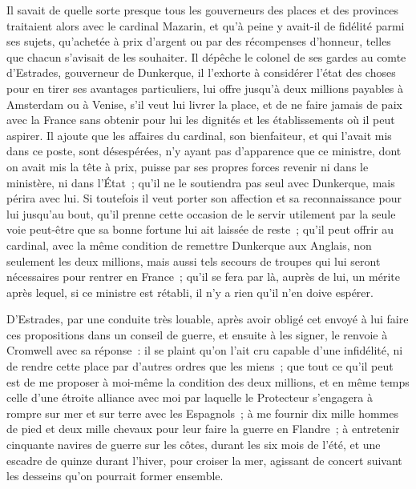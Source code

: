 \documentclass[french,twoside]{book} %
\begin{document}
Il savait de quelle sorte presque tous les gouverneurs des places et des provinces traitaient alors avec le cardinal Mazarin, et qu’à peine y avait-il de fidélité parmi ses sujets, qu’achetée à prix d’argent ou par des récompenses d’honneur, telles que chacun s’avisait de les souhaiter. Il dépêche le colonel de ses gardes au comte d’Estrades, gouverneur de Dunkerque, il l’exhorte à considérer l’état des choses pour en tirer ses avantages particuliers, lui offre jusqu’à deux millions payables à Amsterdam ou à Venise, s’il veut lui livrer la place, et de ne faire jamais de paix avec la France sans obtenir pour lui les dignités et les établissements où il peut aspirer. Il ajoute que les affaires du cardinal, son bienfaiteur, et qui l’avait mis dans ce poste, sont désespérées, n’y ayant pas d’apparence que ce ministre, dont on avait mis la tête à prix, puisse par ses propres forces revenir ni dans le ministère, ni dans l’État ; qu’il ne le soutiendra pas seul avec Dunkerque, mais périra avec lui. Si toutefois il veut porter son affection et sa reconnaissance pour lui jusqu’au bout, qu’il prenne cette occasion de le servir utilement par la seule voie peut-être que sa bonne fortune lui ait laissée de reste ; qu’il peut offrir au cardinal, avec la même condition de remettre Dunkerque aux Anglais, non seulement les deux millions, mais aussi tels secours de troupes qui lui seront nécessaires pour rentrer en France ; qu’il se fera par là, auprès de lui, un mérite après lequel, si ce ministre est rétabli, il n’y a rien qu’il n’en doive espérer.\par
D’Estrades, par une conduite très louable, après avoir obligé cet envoyé à lui faire ces propositions dans un conseil de guerre, et ensuite à les signer, le renvoie à Cromwell avec sa réponse : il se plaint qu’on l’ait cru capable d’une infidélité, ni de rendre cette place par d’autres ordres que les miens ; que tout ce qu’il peut est de me proposer à moi-même la condition des deux millions, et en même temps celle d’une étroite alliance avec moi par laquelle le Protecteur s’engagera à rompre sur mer et sur terre avec les Espagnols ; à me fournir dix mille hommes de pied et deux mille chevaux pour leur faire la guerre en Flandre ; à entretenir cinquante navires de guerre sur les côtes, durant les six mois de l’été, et une escadre de quinze durant l’hiver, pour croiser la mer, agissant de concert suivant les desseins qu’on pourrait former ensemble.\par
\end{document}

